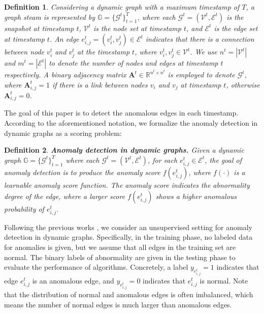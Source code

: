 \documentclass[10pt,journal,compsoc]{IEEEtran}
\newtheorem{definition}{Definition}
\newcommand{\HL}{}
\newcommand{\yg}{}
\begin{document}
\begin{definition}
	 Considering a dynamic graph with a maximum timestamp of $T$, a graph steam is represented by $\mathbb{G}=\{\mathcal{G}^t\}^{T}_{t=1}$, where each $\mathcal{G}^t=(\mathcal{V}^t,\mathcal{E}^t)$ is the snapshot at timestamp $t$, $\mathcal{V}^t$ is the node set \HL{at} timestamp $t$, and $\mathcal{E}^t$ is the edge set \HL{at} timestamp $t$. An edge $e^t_{i,j} = (v_i^t, v_j^t) \in \mathcal{E}^t$ indicates that there is a connection between node $v_i^t$ and $v_j^t$ at the timestamp $t$, where $v_i^t, v_j^t \in \mathcal{V}^t$. We use $n^t=\left| \mathcal{V}^t \right|$ and $m^t=\left| \mathcal{E}^t \right|$ to denote the number of nodes and edges \HL{at} timestamp $t$ respectively. A binary adjacency matrix $\mathbf{A}^t \in \mathbb{R}^{n^t \times n^t}$ is employed to denote $\mathcal{G}^t$, where $\mathbf{A}^t_{i,j} = 1$ if there is a link between nodes $v_i$ and $v_j$ at timestamp $t$, otherwise $\mathbf{A}^t_{i,j} = 0$.
\end{definition}

The goal of this paper is to detect the anomalous edges in each timestamp. According to the aforementioned \yg{notation}, we formalize the anomaly detection in dynamic graphs as a scoring problem:

\begin{definition}{\textbf{Anomaly detection in dynamic graphs.}}
	Given a dynamic graph $\mathbb{G}=\{\mathcal{G}^t\}^{T}_{t=1}$ where each $\mathcal{G}^t=(\mathcal{V}^t,\mathcal{E}^t)$, for each $e^t_{i,j} \in \mathcal{E}^t$, the goal of anomaly detection is to produce the anomaly score $f(e^t_{i,j})$, where $f(\cdot)$ is a learnable anomaly score function. The anomaly score indicates the abnormality degree of the edge, where a larger score $f(e^t_{i,j})$ shows a higher anomalous probability of $e^t_{i,j}$. 
\end{definition}

Following the previous works \cite{yu2018netwalk,zheng2019addgraph,cai2020structural}, we consider an unsupervised setting for anomaly detection in dynamic graphs. Specifically, in the training phase, no labeled data for \HL{anomalies} is given, but we assume that all edges in the training set are normal. The binary labels of abnormality are given in the testing phase to evaluate the performance of algorithms. Concretely, a label $y_{e^t_{i,j}} = 1$ indicates that edge $e^t_{i,j}$ is an anomalous edge, and $y_{e^t_{i,j}} = 0$ indicates that $e^t_{i,j}$ is normal. Note that the \HL{distribution of normal and anomalous edges} is often imbalanced, which means the number of normal edges is much larger than anomalous edges.
\end{document}
